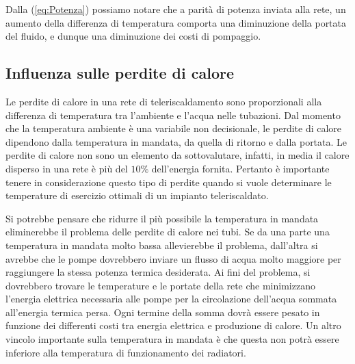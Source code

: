 \documentclass[laurea,oneside,11pt]{USiena_tesiLM3}
\begin{document}
Dalla (\ref{eq:Potenza}) possiamo notare che a parità di potenza inviata alla rete, un aumento della differenza di temperatura comporta una diminuzione della portata del fluido, e dunque una diminuzione dei costi di pompaggio.


\subsection{Influenza sulle perdite di calore}
Le perdite di calore in una rete di teleriscaldamento sono proporzionali alla differenza di temperatura tra l'ambiente e l'acqua nelle tubazioni. Dal momento che la temperatura ambiente è una variabile non decisionale, le perdite di calore dipendono dalla temperatura in mandata, da quella di ritorno e dalla portata. Le perdite di calore non sono un elemento da sottovalutare, infatti, in media il calore disperso in una rete è più del $10\%$ dell'energia fornita. Pertanto è importante tenere in considerazione questo tipo di perdite quando si vuole determinare le temperature di esercizio ottimali di un impianto teleriscaldato.

Si potrebbe pensare che ridurre il più possibile la temperatura in mandata eliminerebbe il problema delle perdite di calore nei tubi. Se da una parte una temperatura in mandata molto bassa allevierebbe il problema, dall'altra si avrebbe che le pompe dovrebbero inviare un flusso di acqua molto maggiore per raggiungere la stessa potenza termica desiderata. Ai fini del problema, si dovrebbero trovare le temperature e le portate  della rete che minimizzano l'energia elettrica necessaria alle pompe per la circolazione dell'acqua sommata all'energia termica persa. Ogni termine della somma dovrà essere pesato 
in funzione dei differenti costi tra energia elettrica e produzione di calore.
Un altro vincolo importante sulla temperatura in mandata è che questa non potrà essere inferiore alla temperatura di funzionamento dei radiatori.  
\end{document}
